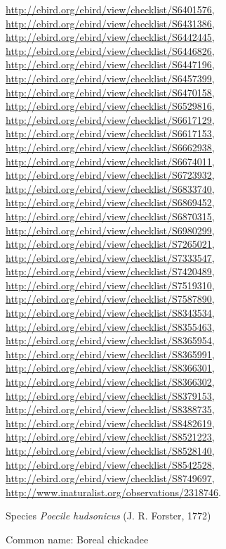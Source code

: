 \documentclass[9pt, article]{memoir}
\begin{document}
\begin{multicols}{2}
\url{http://ebird.org/ebird/view/checklist/S6401576}, 
\url{http://ebird.org/ebird/view/checklist/S6431386}, 
\url{http://ebird.org/ebird/view/checklist/S6442445}, 
\url{http://ebird.org/ebird/view/checklist/S6446826}, 
\url{http://ebird.org/ebird/view/checklist/S6447196}, 
\url{http://ebird.org/ebird/view/checklist/S6457399}, 
\url{http://ebird.org/ebird/view/checklist/S6470158}, 
\url{http://ebird.org/ebird/view/checklist/S6529816}, 
\url{http://ebird.org/ebird/view/checklist/S6617129}, 
\url{http://ebird.org/ebird/view/checklist/S6617153}, 
\url{http://ebird.org/ebird/view/checklist/S6662938}, 
\url{http://ebird.org/ebird/view/checklist/S6674011}, 
\url{http://ebird.org/ebird/view/checklist/S6723932}, 
\url{http://ebird.org/ebird/view/checklist/S6833740}, 
\url{http://ebird.org/ebird/view/checklist/S6869452}, 
\url{http://ebird.org/ebird/view/checklist/S6870315}, 
\url{http://ebird.org/ebird/view/checklist/S6980299}, 
\url{http://ebird.org/ebird/view/checklist/S7265021}, 
\url{http://ebird.org/ebird/view/checklist/S7333547}, 
\url{http://ebird.org/ebird/view/checklist/S7420489}, 
\url{http://ebird.org/ebird/view/checklist/S7519310}, 
\url{http://ebird.org/ebird/view/checklist/S7587890}, 
\url{http://ebird.org/ebird/view/checklist/S8343534}, 
\url{http://ebird.org/ebird/view/checklist/S8355463}, 
\url{http://ebird.org/ebird/view/checklist/S8365954}, 
\url{http://ebird.org/ebird/view/checklist/S8365991}, 
\url{http://ebird.org/ebird/view/checklist/S8366301}, 
\url{http://ebird.org/ebird/view/checklist/S8366302}, 
\url{http://ebird.org/ebird/view/checklist/S8379153}, 
\url{http://ebird.org/ebird/view/checklist/S8388735}, 
\url{http://ebird.org/ebird/view/checklist/S8482619}, 
\url{http://ebird.org/ebird/view/checklist/S8521223}, 
\url{http://ebird.org/ebird/view/checklist/S8528140}, 
\url{http://ebird.org/ebird/view/checklist/S8542528}, 
\url{http://ebird.org/ebird/view/checklist/S8749697}, 
\url{http://www.inaturalist.org/observations/2318746}.

\vspace{6pt}\noindent\hspace{36pt}Species \textit{Poecile hudsonicus} (J. R. Forster, 1772)


Common name: Boreal chickadee


\end{multicols}
\end{document}
